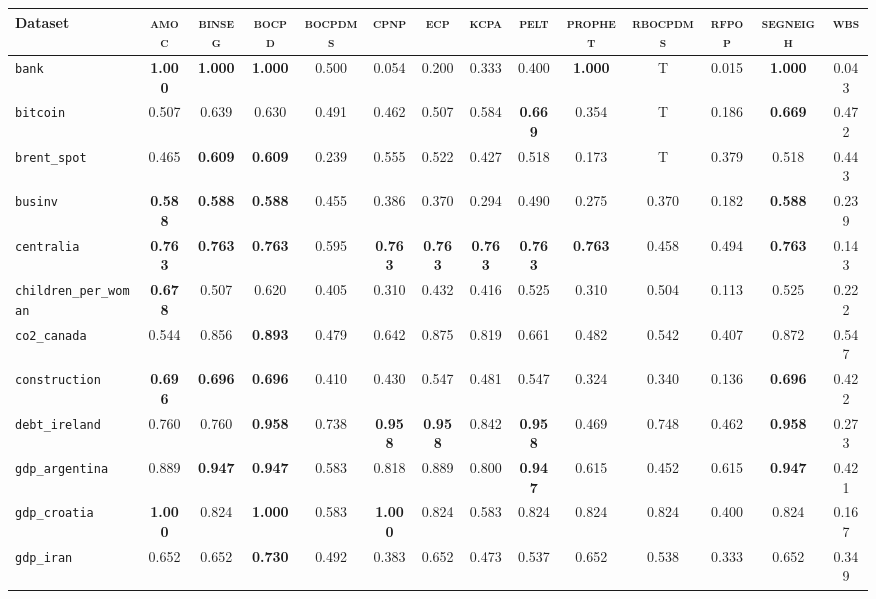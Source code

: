 \begin{tabular}{lccccccccccccc}
Dataset & \textsc{amoc} & \textsc{binseg} & \textsc{bocpd} & \textsc{bocpdms} & \textsc{cpnp} & \textsc{ecp} & \textsc{kcpa} & \textsc{pelt} & \textsc{prophet} & \textsc{rbocpdms} & \textsc{rfpop} & \textsc{segneigh} & \textsc{wbs}\\
\hline
\verb+bank+ & \textbf{1.000} & \textbf{1.000} & \textbf{1.000} & 0.500 & 0.054 & 0.200 & 0.333 & 0.400 & \textbf{1.000} & T & 0.015 & \textbf{1.000} & 0.043\\
\verb+bitcoin+ & 0.507 & 0.639 & 0.630 & 0.491 & 0.462 & 0.507 & 0.584 & \textbf{0.669} & 0.354 & T & 0.186 & \textbf{0.669} & 0.472\\
\verb+brent_spot+ & 0.465 & \textbf{0.609} & \textbf{0.609} & 0.239 & 0.555 & 0.522 & 0.427 & 0.518 & 0.173 & T & 0.379 & 0.518 & 0.443\\
\verb+businv+ & \textbf{0.588} & \textbf{0.588} & \textbf{0.588} & 0.455 & 0.386 & 0.370 & 0.294 & 0.490 & 0.275 & 0.370 & 0.182 & \textbf{0.588} & 0.239\\
\verb+centralia+ & \textbf{0.763} & \textbf{0.763} & \textbf{0.763} & 0.595 & \textbf{0.763} & \textbf{0.763} & \textbf{0.763} & \textbf{0.763} & \textbf{0.763} & 0.458 & 0.494 & \textbf{0.763} & 0.143\\
\verb+children_per_woman+ & \textbf{0.678} & 0.507 & 0.620 & 0.405 & 0.310 & 0.432 & 0.416 & 0.525 & 0.310 & 0.504 & 0.113 & 0.525 & 0.222\\
\verb+co2_canada+ & 0.544 & 0.856 & \textbf{0.893} & 0.479 & 0.642 & 0.875 & 0.819 & 0.661 & 0.482 & 0.542 & 0.407 & 0.872 & 0.547\\
\verb+construction+ & \textbf{0.696} & \textbf{0.696} & \textbf{0.696} & 0.410 & 0.430 & 0.547 & 0.481 & 0.547 & 0.324 & 0.340 & 0.136 & \textbf{0.696} & 0.422\\
\verb+debt_ireland+ & 0.760 & 0.760 & \textbf{0.958} & 0.738 & \textbf{0.958} & \textbf{0.958} & 0.842 & \textbf{0.958} & 0.469 & 0.748 & 0.462 & \textbf{0.958} & 0.273\\
\verb+gdp_argentina+ & 0.889 & \textbf{0.947} & \textbf{0.947} & 0.583 & 0.818 & 0.889 & 0.800 & \textbf{0.947} & 0.615 & 0.452 & 0.615 & \textbf{0.947} & 0.421\\
\verb+gdp_croatia+ & \textbf{1.000} & 0.824 & \textbf{1.000} & 0.583 & \textbf{1.000} & 0.824 & 0.583 & 0.824 & 0.824 & 0.824 & 0.400 & 0.824 & 0.167\\
\verb+gdp_iran+ & 0.652 & 0.652 & \textbf{0.730} & 0.492 & 0.383 & 0.652 & 0.473 & 0.537 & 0.652 & 0.538 & 0.333 & 0.652 & 0.349\\

\end{tabular}
